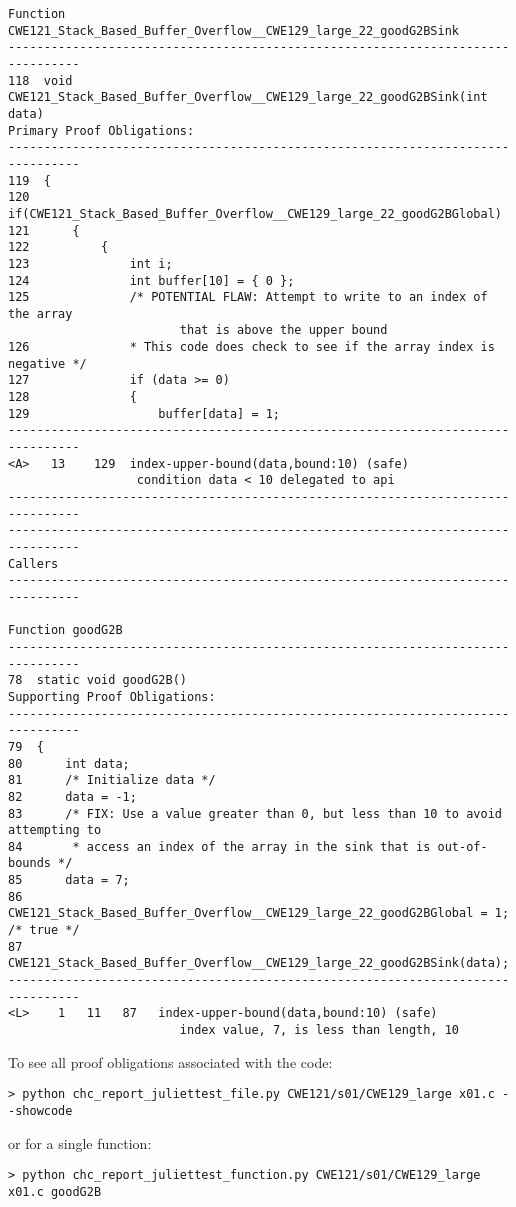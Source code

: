 \documentclass[11pt]{article}
\begin{document}
\begin{scriptsize}
\begin{verbatim}
Function CWE121_Stack_Based_Buffer_Overflow__CWE129_large_22_goodG2BSink
--------------------------------------------------------------------------------
118  void CWE121_Stack_Based_Buffer_Overflow__CWE129_large_22_goodG2BSink(int data)
Primary Proof Obligations:
--------------------------------------------------------------------------------
119  {
120      if(CWE121_Stack_Based_Buffer_Overflow__CWE129_large_22_goodG2BGlobal)
121      {
122          {
123              int i;
124              int buffer[10] = { 0 };
125              /* POTENTIAL FLAW: Attempt to write to an index of the array 
                        that is above the upper bound
126              * This code does check to see if the array index is negative */
127              if (data >= 0)
128              {
129                  buffer[data] = 1;
--------------------------------------------------------------------------------
<A>   13    129  index-upper-bound(data,bound:10) (safe)
                  condition data < 10 delegated to api
--------------------------------------------------------------------------------
--------------------------------------------------------------------------------
Callers
--------------------------------------------------------------------------------

Function goodG2B
--------------------------------------------------------------------------------
78  static void goodG2B()
Supporting Proof Obligations:
--------------------------------------------------------------------------------
79  {
80      int data;
81      /* Initialize data */
82      data = -1;
83      /* FIX: Use a value greater than 0, but less than 10 to avoid attempting to
84       * access an index of the array in the sink that is out-of-bounds */
85      data = 7;
86      CWE121_Stack_Based_Buffer_Overflow__CWE129_large_22_goodG2BGlobal = 1; /* true */
87      CWE121_Stack_Based_Buffer_Overflow__CWE129_large_22_goodG2BSink(data);
--------------------------------------------------------------------------------
<L>    1   11   87   index-upper-bound(data,bound:10) (safe)
                        index value, 7, is less than length, 10
\end{verbatim}
\end{scriptsize}

To see all proof obligations associated with the code:

\begin{verbatim}
> python chc_report_juliettest_file.py CWE121/s01/CWE129_large x01.c --showcode
\end{verbatim}
or for a single function:
\begin{verbatim}
> python chc_report_juliettest_function.py CWE121/s01/CWE129_large x01.c goodG2B
\end{verbatim}
\end{document}
